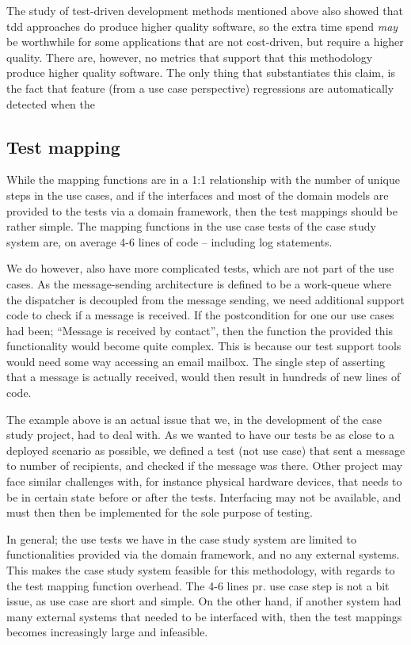 The study of test-driven development methods mentioned above also showed that tdd approaches do produce higher quality software, so the extra time spend \emph{may} be worthwhile for some applications that are not cost-driven, but require a higher quality. There are, however, no metrics that support that this methodology produce higher quality software. The only thing that substantiates this claim, is the fact that feature (from a use case perspective) regressions are automatically detected when the

\subsection{Test mapping}
While the mapping functions are in a 1:1 relationship with the number of unique steps in the use cases, and if the interfaces and most of the domain models are provided to the tests via a domain framework, then the test mappings should be rather simple. The mapping functions in the use case tests of the case study system are, on average 4-6 lines of code -- including log statements.\medskip

\noindent We do however, also have more complicated tests, which are not part of the use cases. As the message-sending architecture is defined to be a work-queue where the dispatcher is decoupled from the message sending, we need additional support code to check if a message is received. If the postcondition for one our use cases had been; ``Message is received by contact'', then the function the provided this functionality would become quite complex. This is because our test support tools would need some way accessing an email mailbox. The single step of asserting that a message is actually received, would then result in hundreds of new lines of code.\medskip

\noindent The example above is an actual issue that we, in the development of the case study project, had to deal with. As we wanted to have our tests be as close to a deployed scenario as possible, we defined a test (not use case) that sent a message to number of recipients, and checked if the message was there. Other project may face similar challenges with, for instance physical hardware devices, that needs to be in certain state before or after the tests. Interfacing may not be available, and must then then be implemented for the sole purpose of testing.\medskip

\noindent In general; the use tests we have in the case study system are limited to functionalities provided via the domain framework, and no any external systems. This makes the case study system feasible for this methodology, with regards to the test mapping function overhead. The 4-6 lines pr. use case step is not a bit issue, as use case are short and simple. On the other hand, if another system had many external systems that needed to be interfaced with, then the test mappings becomes increasingly large and infeasible.

